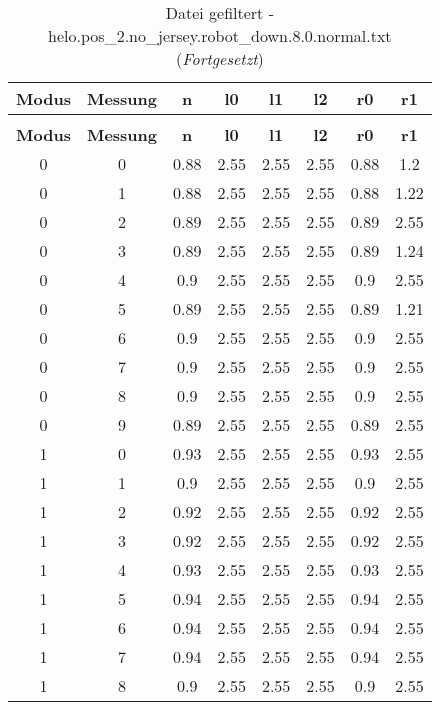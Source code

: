 \begin{longtable}{|c|c||c||c|c|c||c|c|}
	\caption{Datei gefiltert - helo.pos\_2.no\_jersey.robot\_down.8.0.normal.txt} \label{tab:helo.pos-2.no-jersey.robot-down.8.0.normal.txt} \\ \hline
	\textbf{Modus} & \textbf{Messung} & \textbf{n} & \textbf{l0} & \textbf{l1} & \textbf{l2} & \textbf{r0} & \textbf{r1}\\ \hline
	\endfirsthead
	\caption[]{Datei gefiltert - helo.pos\_2.no\_jersey.robot\_down.8.0.normal.txt (\emph{Fortgesetzt})} \\ \hline
	\textbf{Modus} & \textbf{Messung} & \textbf{n} & \textbf{l0} & \textbf{l1} & \textbf{l2} & \textbf{r0} & \textbf{r1}\\ \hline
	\endhead
	0 & 0 & 0.88 & 2.55 & 2.55 & 2.55 & 0.88 & 1.2 \\ \hline
	0 & 1 & 0.88 & 2.55 & 2.55 & 2.55 & 0.88 & 1.22 \\ \hline
	0 & 2 & 0.89 & 2.55 & 2.55 & 2.55 & 0.89 & 2.55 \\ \hline
	0 & 3 & 0.89 & 2.55 & 2.55 & 2.55 & 0.89 & 1.24 \\ \hline
	0 & 4 & 0.9 & 2.55 & 2.55 & 2.55 & 0.9 & 2.55 \\ \hline
	0 & 5 & 0.89 & 2.55 & 2.55 & 2.55 & 0.89 & 1.21 \\ \hline
	0 & 6 & 0.9 & 2.55 & 2.55 & 2.55 & 0.9 & 2.55 \\ \hline
	0 & 7 & 0.9 & 2.55 & 2.55 & 2.55 & 0.9 & 2.55 \\ \hline
	0 & 8 & 0.9 & 2.55 & 2.55 & 2.55 & 0.9 & 2.55 \\ \hline
	0 & 9 & 0.89 & 2.55 & 2.55 & 2.55 & 0.89 & 2.55 \\ \hline
	1 & 0 & 0.93 & 2.55 & 2.55 & 2.55 & 0.93 & 2.55 \\ \hline
	1 & 1 & 0.9 & 2.55 & 2.55 & 2.55 & 0.9 & 2.55 \\ \hline
	1 & 2 & 0.92 & 2.55 & 2.55 & 2.55 & 0.92 & 2.55 \\ \hline
	1 & 3 & 0.92 & 2.55 & 2.55 & 2.55 & 0.92 & 2.55 \\ \hline
	1 & 4 & 0.93 & 2.55 & 2.55 & 2.55 & 0.93 & 2.55 \\ \hline
	1 & 5 & 0.94 & 2.55 & 2.55 & 2.55 & 0.94 & 2.55 \\ \hline
	1 & 6 & 0.94 & 2.55 & 2.55 & 2.55 & 0.94 & 2.55 \\ \hline
	1 & 7 & 0.94 & 2.55 & 2.55 & 2.55 & 0.94 & 2.55 \\ \hline
	1 & 8 & 0.9 & 2.55 & 2.55 & 2.55 & 0.9 & 2.55 \\ \hline

\end{longtable}
